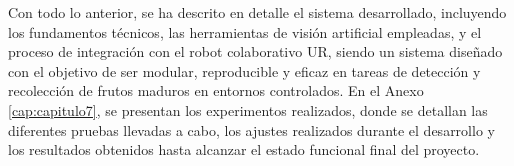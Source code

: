 Con todo lo anterior, se ha descrito en detalle el sistema desarrollado, incluyendo los fundamentos técnicos, las herramientas de visión artificial empleadas, y el proceso de integración con el robot colaborativo UR, siendo un sistema diseñado con el objetivo de ser modular, reproducible y eficaz en tareas de detección y recolección de frutos maduros en entornos controlados. En el Anexo \ref{cap:capitulo7}, se presentan los experimentos realizados, donde se detallan las diferentes pruebas llevadas a cabo, los ajustes realizados durante el desarrollo y los resultados obtenidos hasta alcanzar el estado funcional final del proyecto.

















